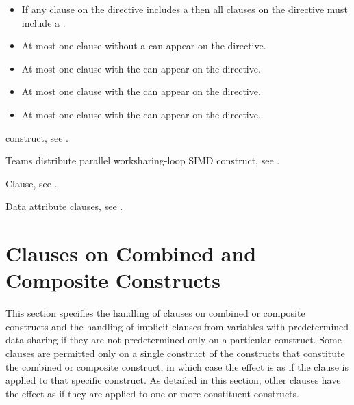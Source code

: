 \begin{itemize}
\item If any  clause on the directive includes a
       then all  clauses
      on the directive must include a .
\item At most one  clause without a
       can appear on the directive.
\item At most one  clause with the 
       can appear on the directive.
\item At most one  clause with the 
       can appear on the directive.
\item At most one  clause with the 
       can appear on the directive.
\end{itemize}

\begin{crossrefs}
\item {} construct, see .

\item Teams distribute parallel worksharing-loop SIMD construct, see
.

\item {} Clause, see .

\item Data attribute clauses, see
.
\end{crossrefs}



\section{Clauses on Combined and Composite Constructs}
\label{sec:Clauses on Combined and Composite Constructs}
This section specifies the handling of clauses on combined or composite constructs 
and the handling of implicit clauses from variables with predetermined data sharing 
if they are not predetermined only on a particular construct. Some clauses are 
permitted only on a single construct of the constructs that constitute the 
combined or composite construct, in which case the effect is as if the 
clause is applied to that specific construct. As detailed in this section, other 
clauses have the effect as if they are applied to one or more constituent constructs.

